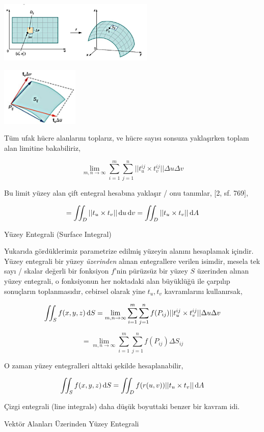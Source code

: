 \documentclass[12pt,fleqn]{article}\usepackage{../../common}
\begin{document}
\includegraphics[width=20em]{calc_multi_75_app_01.jpg}

\includegraphics[width=10em]{calc_multi_75_app_02.jpg}

Tüm ufak hücre alanlarını toplarız, ve hücre sayısı sonsuza yaklaşırken toplam
alan limitine bakabiliriz,

$$
\lim_{m,n \to \infty} \sum_{i=1}^{m} \sum_{j=1}^{n} || t_u^{ij} \times t_v^{ij} || \Delta u \Delta v
$$

Bu limit yüzey alan çift entegral hesabına yaklaşır / onu tanımlar, [2, sf. 769],

$$
= \iint_D || t_u \times t_v || \,\mathrm{d} u \,\mathrm{d} v = \iint_D || t_u \times t_v || \,\mathrm{d} A
$$

Yüzey Entegrali (Surface Integral)

Yukarıda gördüklerimiz parametrize edilmiş yüzeyin alanını hesaplamak içindir.
Yüzey entegrali bir yüzey {\em üzerinden} alınan entegrallere verilen isimdir,
mesela tek sayı / skalar değerli bir fonksiyon $f$'nin pürüzsüz bir yüzey $S$
üzerinden alınan yüzey entegrali, o fonksiyonun her noktadaki alan büyüklüğü ile
çarpılıp sonuçların toplanmasıdır, cebirsel olarak yine $t_u,t_v$ kavramlarını
kullanırsak,

$$
\iint_S f(x,y,z) \,\mathrm{d} S 
= \lim_{m,n \to \infty} \sum_{i=1}^{m} \sum_{j=1}^{n} f(P_{ij}) || t_u^{ij} \times t_v^{ij} || \Delta u \Delta v
$$

$$
= \lim_{m,n \to \infty} \sum_{i=1}^{m} \sum_{j=1}^{n} f(P_{ij}) \Delta S_{ij} 
$$

O zaman yüzey entegralleri alttaki şekilde hesaplanabilir,

$$
\iint_S f(x,y,z) \,\mathrm{d} S =
\iint_D f(r(u,v)) || t_u \times t_v || \,\mathrm{d} A
$$

Çizgi entegrali (line integrals) daha düşük boyuttaki benzer bir kavram idi.

Vektör Alanları Üzerinden Yüzey Entegrali
\end{document}
